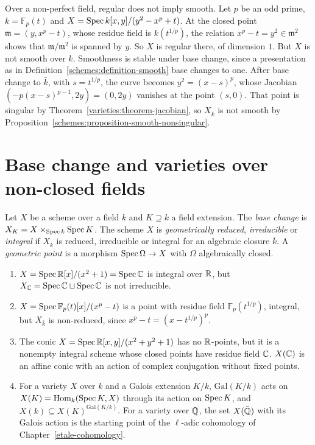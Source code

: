 \begin{counterexample}\label{schemes:counterexample-regular-not-smooth}
Over a non-perfect field, regular does not imply smooth. Let $p$ be an odd prime, $k = \mathbb{F}_p(t)$ and $X = \operatorname{Spec} k[x, y]/(y^2 - x^p + t)$. At the closed point
$\mathfrak{m} = (y, x^p - t)$, whose residue field is $k(t^{1/p})$, the relation $x^p - t = y^2 \in \mathfrak{m}^2$ shows that $\mathfrak{m}/\mathfrak{m}^2$ is spanned by $y$. So
$X$ is regular there, of dimension $1$. But $X$ is not smooth over $k$. Smoothness is stable under base change, since a presentation as in
Definition~\ref{schemes:definition-smooth} base changes to one. After base change to $\bar k$, with $s = t^{1/p}$, the curve becomes
$y^2 = (x - s)^p$, whose Jacobian $(-p(x - s)^{p-1}, 2y) = (0, 2y)$ vanishes at the point $(s, 0)$. That point is singular by
Theorem~\ref{varieties:theorem-jacobian}, so $X_{\bar k}$ is not smooth by Proposition~\ref{schemes:proposition-smooth-nonsingular}.
\end{counterexample}

\section{Base change and varieties over non-closed fields}\label{schemes:section-base-change}

\begin{definition}\label{schemes:definition-geometric}
Let $X$ be a scheme over a field $k$ and $K \supseteq k$ a field extension. The \emph{base change} is $X_K = X \times_{\operatorname{Spec} k}\operatorname{Spec} K$. The scheme $X$ is
\emph{geometrically reduced}, \emph{irreducible} or \emph{integral} if $X_{\bar k}$ is reduced, irreducible or integral for an algebraic closure $\bar k$. A
\emph{geometric point} is a morphism $\operatorname{Spec}\Omega \to X$ with $\Omega$ algebraically closed.
\end{definition}

\begin{example}\label{schemes:example-non-closed-fields}
\begin{enumerate}
\item $X = \operatorname{Spec}\mathbb{R}[x]/(x^2 + 1) = \operatorname{Spec}\mathbb{C}$ is integral over $\mathbb{R}$, but $X_{\mathbb{C}} = \operatorname{Spec}\mathbb{C} \sqcup \operatorname{Spec}\mathbb{C}$ is not irreducible.
\item $X = \operatorname{Spec}\mathbb{F}_p(t)[x]/(x^p - t)$ is a point with residue field $\mathbb{F}_p(t^{1/p})$, integral, but $X_{\bar k}$ is non-reduced, since $x^p - t = (x - t^{1/p})^p$.
\item The conic $X = \operatorname{Spec}\mathbb{R}[x, y]/(x^2 + y^2 + 1)$ has no $\mathbb{R}$-points, but it is a nonempty integral scheme whose closed points have residue field $\mathbb{C}$.
$X(\mathbb{C})$ is an affine conic with an action of complex conjugation without fixed points.
\item For a variety $X$ over $k$ and a Galois extension $K/k$, $\mathrm{Gal}(K/k)$ acts on $X(K) = \operatorname{Hom}_k(\operatorname{Spec} K, X)$ through its action on $\operatorname{Spec} K$, and
$X(k) \subseteq X(K)^{\mathrm{Gal}(K/k)}$. For a variety over $\mathbb{Q}$, the set $X(\bar{\mathbb{Q}})$ with its Galois action is the starting point of the $\ell$-adic
cohomology of Chapter~\ref{etale-cohomology}.
\end{enumerate}
\end{example}

